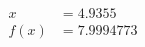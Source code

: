 \documentclass[preview]{standalone}
\begin{document}
\begin{align*}
x &= 4.9355\\f(x) &= 7.9994773
\end{align*}
\end{document}
